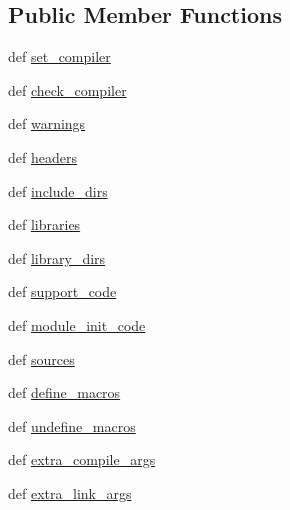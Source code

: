 \subsection*{Public Member Functions}
\begin{DoxyCompactItemize}
\item 
def \hyperlink{classscipy_1_1weave_1_1base__info_1_1base__info_a5d9d689ac4dc547c68f915b04a2833da}{set\+\_\+compiler}
\item 
def \hyperlink{classscipy_1_1weave_1_1base__info_1_1base__info_a3a52ca521148131e680ccfec1050ba51}{check\+\_\+compiler}
\item 
def \hyperlink{classscipy_1_1weave_1_1base__info_1_1base__info_a5ed7a99e861c2f1d385fce8ef93b723d}{warnings}
\item 
def \hyperlink{classscipy_1_1weave_1_1base__info_1_1base__info_a405fe1a40276b07bcabd7717767db319}{headers}
\item 
def \hyperlink{classscipy_1_1weave_1_1base__info_1_1base__info_a131ac45c60405c9796f0da246a564ea1}{include\+\_\+dirs}
\item 
def \hyperlink{classscipy_1_1weave_1_1base__info_1_1base__info_a82a0684cbde9b97cd5cc8772fd5660a8}{libraries}
\item 
def \hyperlink{classscipy_1_1weave_1_1base__info_1_1base__info_a0fc6305d096776a142e88cace8dca43d}{library\+\_\+dirs}
\item 
def \hyperlink{classscipy_1_1weave_1_1base__info_1_1base__info_a3d78a363f4630441f90cbbacd8b5c57e}{support\+\_\+code}
\item 
def \hyperlink{classscipy_1_1weave_1_1base__info_1_1base__info_af9930c7836d16326b57a2210ddf17ec5}{module\+\_\+init\+\_\+code}
\item 
def \hyperlink{classscipy_1_1weave_1_1base__info_1_1base__info_a2e77b29d4aab2c4079d36bae6be9800b}{sources}
\item 
def \hyperlink{classscipy_1_1weave_1_1base__info_1_1base__info_a8e55158157bb41e868fdf6dbe9e9520a}{define\+\_\+macros}
\item 
def \hyperlink{classscipy_1_1weave_1_1base__info_1_1base__info_aa78d9422496fc547a85e6ec42f0cbd71}{undefine\+\_\+macros}
\item 
def \hyperlink{classscipy_1_1weave_1_1base__info_1_1base__info_a4bc8a28b29d1ffa7355273439b032afb}{extra\+\_\+compile\+\_\+args}
\item 
def \hyperlink{classscipy_1_1weave_1_1base__info_1_1base__info_a517443fd80221d41947721e8bcba4b93}{extra\+\_\+link\+\_\+args}
\end{DoxyCompactItemize}
